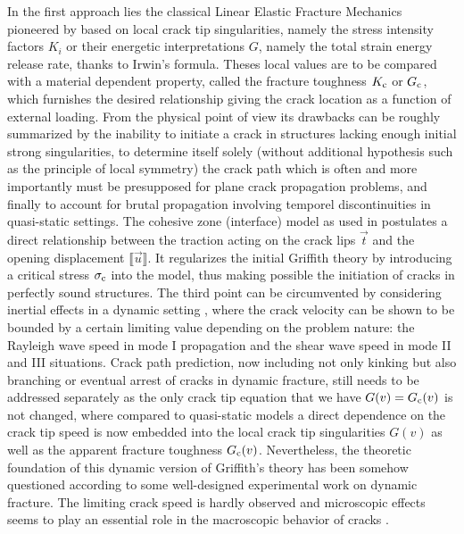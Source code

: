 In the first approach lies the classical Linear Elastic Fracture Mechanics pioneered by \cite{Griffith:1921} based on local crack tip singularities, namely the stress intensity factors $K_i$ or their energetic interpretations $G$, namely the total strain energy release rate, thanks to Irwin's formula. Theses local values are to be compared with a material dependent property, called the fracture toughness $K_{\mathrm{c}}$ or $G_\mathrm{c}$, which furnishes the desired relationship giving the crack location as a function of external loading. From the physical point of view its drawbacks can be roughly summarized \cite{FrancfortMarigo:1998} by the inability to initiate a crack in structures lacking enough initial strong singularities, to determine itself solely (without additional hypothesis such as the principle of local symmetry) the crack path which is often and more importantly must be presupposed for plane crack propagation problems, and finally to account for brutal propagation involving temporel discontinuities in quasi-static settings. The cohesive zone (interface) model as used in \cite{DebruyneLaverneDumouchel:2012,RuizOrtizPandolfi:2000} postulates a direct relationship between the traction acting on the crack lips $\vec{t}$ and the opening displacement $\llbracket\vec{u}\rrbracket$. It regularizes the initial Griffith theory by introducing a critical stress $\sigma_{\mathrm{c}}$ into the model, thus making possible the initiation of cracks in perfectly sound structures. The third point can be circumvented by considering inertial effects in a dynamic setting \cite{Freund:1990}, where the crack velocity can be shown to be bounded by a certain limiting value depending on the problem nature: the Rayleigh wave speed in mode I propagation and the shear wave speed in mode II and III situations. Crack path prediction, now including not only kinking but also branching or eventual arrest of cracks in dynamic fracture, still needs to be addressed separately as the only crack tip equation that we have $G(v)=G_\mathrm{c}(v)$ is not changed, where compared to quasi-static models a direct dependence on the crack tip speed is now embedded into the local crack tip singularities $G(v)$ as well as the apparent fracture toughness $G_\mathrm{c}(v)$. Nevertheless, the theoretic foundation of this dynamic version of Griffith's theory has been somehow questioned \cite{ValorosoDebruyneLaverne:2014} according to some well-designed experimental work on dynamic fracture. The limiting crack speed is hardly observed and microscopic effects seems to play an essential role in the macroscopic behavior of cracks \cite{Ravi-ChandarKnauss:1984a}.

